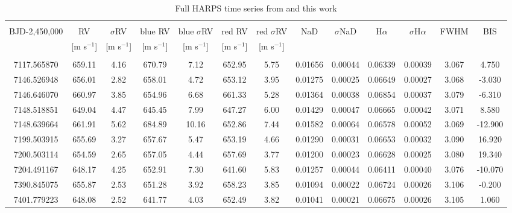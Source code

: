 \clearpage
\begin{landscape}
\begin{table}
\small
\renewcommand{\arraystretch}{0.7}
\centering
\caption{Full HARPS time series from  and this work}
\label{k2182table:data}
\begin{tabular}{ccccccccccccc}
\hline \\ [-1ex]
BJD-2,450,000 & RV & $\sigma$RV & blue RV & blue $\sigma$RV & red RV & red $\sigma$RV & NaD & $\sigma$NaD & H$\alpha$ & $\sigma$H$\alpha$ & FWHM & BIS \\
& [m s$^{-1}$] & [m s$^{-1}$] & [m s$^{-1}$] & [m s$^{-1}$] & [m s$^{-1}$] & [m s$^{-1}$] & & & &  & & \\
\hline \\ [-1ex]
7117.565870 & 659.11 & 4.16 & 670.79 & 7.12 & 652.95 & 5.75 & 0.01656 & 0.00044 & 0.06339 & 0.00039 & 3.067 & 4.750 \\
7146.526948 & 656.01 & 2.82 & 658.01 & 4.72 & 653.12 & 3.95 & 0.01275 & 0.00025 & 0.06649 & 0.00027 & 3.068 & -3.030 \\
7146.646070 & 660.97 & 3.85 & 654.96 & 6.68 & 661.33 & 5.28 & 0.01364 & 0.00038 & 0.06854 & 0.00037 & 3.079 & -6.310 \\
7148.518851 & 649.04 & 4.47 & 645.45 & 7.99 & 647.27 & 6.00 & 0.01429 & 0.00047 & 0.06665 & 0.00042 & 3.071 & 8.580 \\
7148.639664 & 661.91 & 5.62 & 684.89 & 10.16 & 652.86 & 7.44 & 0.01582 & 0.00064 & 0.06578 & 0.00052 & 3.069 & -12.900 \\
7199.503915 & 655.69 & 3.27 & 657.67 & 5.47 & 653.19 & 4.66 & 0.01290 & 0.00031 & 0.06653 & 0.00032 & 3.090 & 16.920 \\
7200.503114 & 654.59 & 2.65 & 657.05 & 4.44 & 657.69 & 3.77 & 0.01200 & 0.00023 & 0.06628 & 0.00025 & 3.080 & 19.340 \\
7204.491167 & 648.17 & 4.25 & 652.91 & 7.30 & 641.60 & 5.83 & 0.01257 & 0.00044 & 0.06411 & 0.00040 & 3.076 & -10.070 \\
7390.845075 & 655.87 & 2.53 & 651.28 & 3.92 & 658.23 & 3.85 & 0.01094 & 0.00022 & 0.06724 & 0.00026 & 3.106 & -0.200 \\
7401.779223 & 648.08 & 2.52 & 641.77 & 4.03 & 652.49 & 3.82 & 0.01041 & 0.00021 & 0.06675 & 0.00026 & 3.105 & 1.060 \\

\end{tabular}
\end{table}
\end{landscape}
